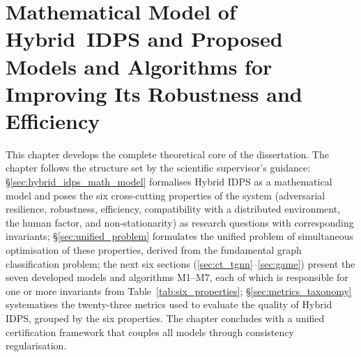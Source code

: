 
\chapter{Mathematical Model of Hybrid~IDPS and Proposed Models and Algorithms for Improving Its Robustness and Efficiency}
\label{ch:methods}

This chapter develops the complete theoretical core of the
dissertation. The chapter follows the structure set by the
scientific supervisor's guidance:
\S\ref{sec:hybrid_idps_math_model} formalises Hybrid IDPS as a
mathematical model and poses the six cross-cutting properties of the
system (adversarial resilience, robustness, efficiency, compatibility
with a distributed environment, the human factor, and non-stationarity)
as research questions with corresponding invariants;
\S\ref{sec:unified_problem} formulates the unified problem of
simultaneous optimisation of these properties, derived from the
fundamental graph classification problem; the next six sections
(\ref{sec:ct_tgnn}--\ref{sec:game}) present the seven developed
models and algorithms M1--M7, each of which is responsible for one
or more invariants from Table~\ref{tab:six_properties};
\S\ref{sec:metrics_taxonomy} systematises the twenty-three metrics
used to evaluate the quality of Hybrid IDPS, grouped by the six
properties. The chapter concludes with a unified certification
framework that couples all models through consistency regularisation.

